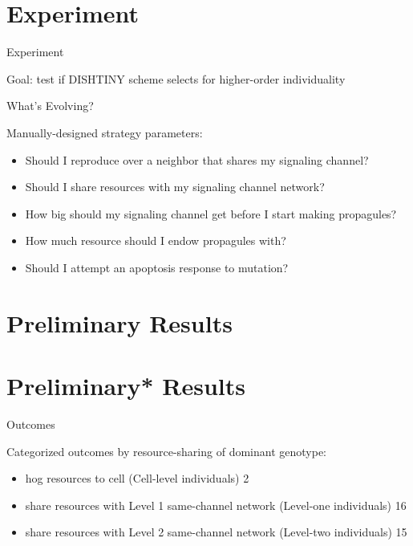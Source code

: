 \section{Experiment}

\begin{frame}{Experiment}

Goal: test if DISHTINY scheme selects for higher-order individuality

\end{frame}

\begin{frame}{What's Evolving?}

Manually-designed strategy parameters:
\begin{itemize}
\item Should I reproduce over a neighbor that shares my signaling channel?
\item Should I share resources with my signaling channel network?
\item How big should my signaling channel get before I start making propagules?
\item How much resource should I endow propagules with?
\item Should I attempt an apoptosis response to mutation?
\end{itemize}
\end{frame}

\section{Preliminary Results}
\section{Preliminary\** Results}


\begin{frame}{Outcomes}

Categorized outcomes by resource-sharing of dominant genotype:
\begin{itemize}
\item hog resources to cell (Cell-level individuals) 2
\item share resources with Level 1 same-channel network (Level-one individuals) 16
\item share resources with Level 2 same-channel network (Level-two individuals) 15
\end{itemize}

\end{frame}

